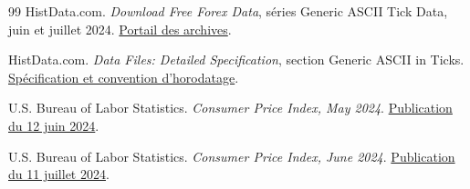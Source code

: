 \documentclass[11pt,a4paper]{article}
\theoremstyle{clair}
\begin{document}
\begin{thebibliography}{99}
HistData.com. \emph{Download Free Forex Data}, séries Generic ASCII Tick Data, juin et juillet 2024.
\href{https://www.histdata.com/download-free-forex-data/}{Portail des archives}.

HistData.com. \emph{Data Files: Detailed Specification}, section Generic ASCII in Ticks.
\href{https://www.histdata.com/f-a-q/data-files-detailed-specification/}{Spécification et convention d'horodatage}.

U.S. Bureau of Labor Statistics. \emph{Consumer Price Index, May 2024}.
\href{https://www.bls.gov/news.release/archives/cpi_06122024.htm}{Publication du 12 juin 2024}.

U.S. Bureau of Labor Statistics. \emph{Consumer Price Index, June 2024}.
\href{https://www.bls.gov/news.release/archives/cpi_07112024.htm}{Publication du 11 juillet 2024}.
\end{thebibliography}
\end{document}
